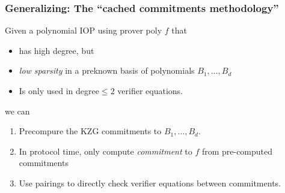 \documentclass[shadesubsections,compress,14pt,mathserif]{beamer}
\begin{document}
\begin{frame}
\frametitle{Generalizing: The ``cached commitments methodology''}
 Given a polynomial IOP using prover poly $f$ that
 \begin{itemize}
  \item has high degree, but
  \item \emph{low sparsity} in a preknown basis of polynomials $B_1,\ldots,B_d$
  \item Is only used in degree$\leq 2$ verifier equations.
 \end{itemize}
 we can\pause
 \begin{enumerate}
  \item Precompure the KZG commitments to $B_1,\ldots,B_d$.
  \item In protocol time, only compute \emph{commitment} to $f$ from pre-computed commitments
  \item Use pairings to directly check verifier equations between commitments.
 \end{enumerate}
 \end{frame}
\end{document}
